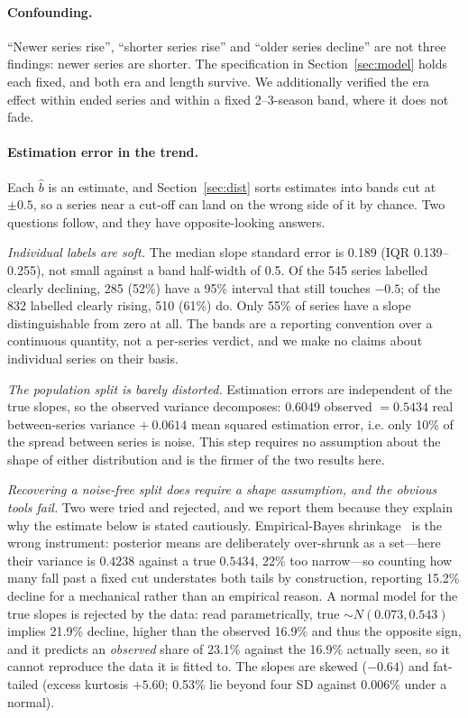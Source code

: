 \documentclass[11pt,a4paper]{article}
\begin{document}
\paragraph{Confounding.}
``Newer series rise'', ``shorter series rise'' and ``older series decline'' are
not three findings: newer series are shorter. The specification in
Section~\ref{sec:model} holds each fixed, and both era and length survive. We
additionally verified the era effect within ended series and within a fixed
2--3-season band, where it does not fade.

\paragraph{Estimation error in the trend.}
\label{sec:esterr}
Each $\hat{b}$ is an estimate, and Section~\ref{sec:dist} sorts estimates into
bands cut at $\pm 0.5$, so a series near a cut-off can land on the wrong side of
it by chance. Two questions follow, and they have opposite-looking answers.

\emph{Individual labels are soft.} The median slope standard error is 0.189 (IQR
0.139--0.255), not small against a band half-width of 0.5. Of the 545 series
labelled clearly declining, 285 (52\%) have a 95\% interval that still touches
$-0.5$; of the 832 labelled clearly rising, 510 (61\%) do. Only 55\% of series
have a slope distinguishable from zero at all. The bands are a reporting
convention over a continuous quantity, not a per-series verdict, and we make no
claims about individual series on their basis.

\emph{The population split is barely distorted.} Estimation errors are
independent of the true slopes, so the observed variance decomposes: $0.6049$
observed $= 0.5434$ real between-series variance $+\ 0.0614$ mean squared
estimation error, i.e. only 10\% of the spread between series is noise. This step
requires no assumption about the shape of either distribution and is the firmer
of the two results here.

\emph{Recovering a noise-free split does require a shape assumption, and the
obvious tools fail.} Two were tried and rejected, and we report them because they
explain why the estimate below is stated cautiously. Empirical-Bayes
shrinkage~\cite{efron} is the wrong instrument: posterior means are deliberately
over-shrunk as a set---here their variance is $0.4238$ against a true
$0.5434$, 22\% too narrow---so counting how many fall past a fixed cut
understates both tails by construction, reporting 15.2\% decline for a mechanical
rather than an empirical reason. A normal model for the true slopes is rejected by
the data: read parametrically, true $\sim N(0.073, 0.543)$ implies 21.9\%
decline, higher than the observed 16.9\% and thus the opposite sign, and it
predicts an \emph{observed} share of 23.1\% against the 16.9\% actually seen, so
it cannot reproduce the data it is fitted to. The slopes are skewed ($-0.64$) and
fat-tailed (excess kurtosis $+5.60$; 0.53\% lie beyond four SD against 0.006\%
under a normal).
\end{document}
